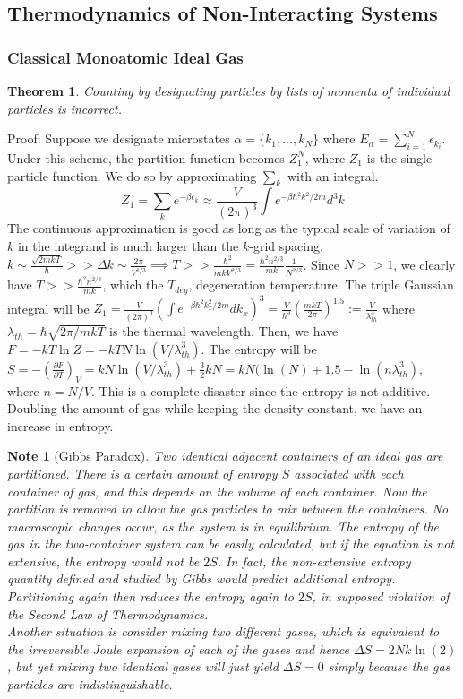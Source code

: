 \documentclass[a4paper]{article}
\newtheorem{note}{Note}[section]
\newtheorem{thm}{Theorem}[section]
\theoremstyle{new}
\begin{document}
\subsection{Thermodynamics of Non-Interacting Systems}
\subsubsection*{Classical Monoatomic Ideal Gas}
\begin{thm}
Counting by designating particles by lists of momenta of individual particles is incorrect.
\end{thm}
Proof: Suppose we designate microstates $\alpha=\{k_1,...,k_N\}$ where $E_\alpha=\sum_{i=1}^N\epsilon_{k_i}$. Under this scheme, the partition function becomes $Z_1^N$, where $Z_1$ is the single particle function. We do so by approximating $\sum_k$ with an integral.
$$Z_1=\sum_ke^{-\beta\epsilon_k}\approx\frac{V}{(2\pi)^3}\int e^{-\beta\hbar^2k^2/2m}d^3k$$
The continuous approximation is good as long as the typical scale of variation of $k$ in the integrand is much larger than the $k$-grid spacing. $k\sim\frac{\sqrt{2mkT}}{\hbar}>>\Delta k\sim\frac{2\pi}{V^{1/3}}\implies T>>\frac{\hbar^2}{mkV^{2/3}}=\frac{\hbar^2n^{2/3}}{mk}\frac{1}{N^{2/3}}$. Since $N>>1$, we clearly have $T>>\frac{\hbar^2n^{2/3}}{mk}$, which the $T_{deg}$, degeneration temperature. The triple Gaussian integral will be $Z_1=\frac{V}{(2\pi)^3}(\int e^{-\beta\hbar^2k_x^2/2m}dk_x)^3=\frac{V}{\hbar^3}(\frac{mkT}{2\pi})^{1.5}:=\frac{V}{\lambda_{th}^3}$ where $\lambda_{th}=\hbar\sqrt{2\pi/mkT}$ is the thermal wavelength. Then, we have $F=-kT\ln Z=-kTN\ln(V/\lambda^3_{th})$. The entropy will be $S=-(\frac{\partial F}{\partial T})_V=kN\ln(V/\lambda_{th}^3)+\frac{3}{2}kN=kN(\ln(N)+1.5-\ln(n\lambda_{th}^3)$, where $n=N/V$. This is a complete disaster since the entropy is not additive. Doubling the amount of gas while keeping the density constant, we have an increase in entropy.
\begin{note}[Gibbs Paradox]
Two identical adjacent containers of an ideal gas are partitioned. There is a certain amount of entropy $S$ associated with each container of gas, and this depends on the volume of each container. Now the partition is removed to allow the gas particles to mix between the containers. No macroscopic changes occur, as the system is in equilibrium. The entropy of the gas in the two-container system can be easily calculated, but if the equation is not extensive, the entropy would not be $2S$. In fact, the non-extensive entropy quantity defined and studied by Gibbs would predict additional entropy. Partitioning again then reduces the entropy again to $2S$, in supposed violation of the Second Law of Thermodynamics.\\[5pt]
Another situation is consider mixing two different gases, which is equivalent to the irreversible Joule expansion of each of the gases and hence $\Delta S=2Nk\ln(2)$, but yet mixing two identical gases will just yield $\Delta S=0$ simply because the gas particles are indistinguishable.
\end{note}
\end{document}
